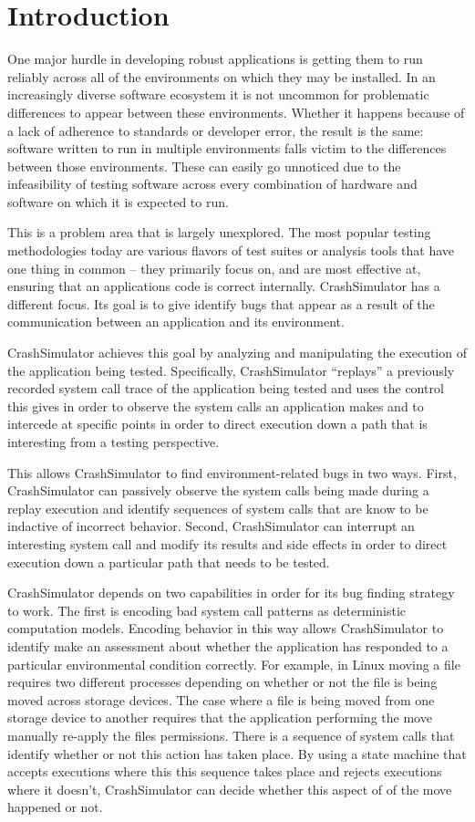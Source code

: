 \section{Introduction}

One major hurdle in developing robust applications is getting them to run reliably across all of the environments on
which they may be installed.  In an increasingly diverse software ecosystem it is not uncommon for problematic
differences to appear between these environments.  Whether it happens because of a lack of adherence to standards or
developer error, the result is the same: software written to run in multiple environments falls victim to the
differences between those environments.  These can easily go unnoticed due to the infeasibility of testing software
across every combination of hardware and software on which it is expected to run.

This is a problem area that is largely unexplored.  The most popular testing methodologies today are various flavors of
test suites or analysis tools that have one thing in common -- they primarily focus on, and are most effective at,
ensuring that an applications code is correct internally.  CrashSimulator has a different focus.  Its goal is to give
identify bugs that appear as a result of the communication between an application and its environment.

CrashSimulator achieves this goal by analyzing and manipulating the execution of the application being tested.
Specifically, CrashSimulator ``replays'' a previously recorded system call trace of the application being tested and
uses the control this gives in order to observe the system calls an application makes and to intercede at specific
points in order to direct execution down a path that is interesting from a testing perspective.

This allows CrashSimulator to find environment-related bugs in two ways.  First, CrashSimulator can passively observe
the system calls being made during a replay execution and identify sequences of system calls that are know to be
indactive of incorrect behavior.  Second, CrashSimulator can interrupt an interesting system call and modify its results
and side effects in order to direct execution down a particular path that needs to be tested.

CrashSimulator depends on two capabilities in order for its bug finding strategy to work.  The first is encoding bad
system call patterns as deterministic computation models.  Encoding behavior in this way allows CrashSimulator to
identify make an assessment about whether the application has responded to a particular environmental condition
correctly.  For example, in Linux moving a file requires two different processes depending on whether or not the file is
being moved across storage devices.  The case where a file is being moved from one storage device to another requires
that the application performing the move manually re-apply the files permissions.  There is a sequence of system calls
that identify whether or not this action has taken place.  By using a state machine that accepts executions where this
this sequence takes place and rejects executions where it doesn't, CrashSimulator can decide whether this aspect of of
the move happened or not.

